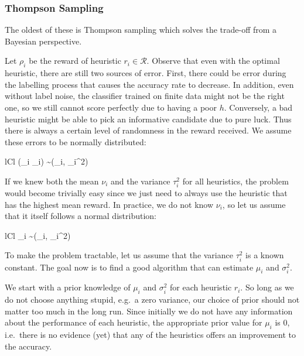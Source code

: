\documentclass[fleqn,10pt,lineno]{wlpeerj} %
\newcommand{\Normal}{\mathcal{N}}
\newcommand{\R}{\mathcal{R}}
\begin{document}
\subsubsection*{Thompson Sampling}

The oldest of these is Thompson sampling \citep{thompson33} which solves the
trade-off from a Bayesian perspective.

Let $\rho_i$ be the reward of heuristic $r_i \in \R$. Observe
that even with the optimal heuristic, there are still two sources of error.
First, there could be error during the labelling process that causes the
accuracy rate to decrease. In addition, even without label noise, the
classifier trained on finite data might not be the right one, so we still
cannot score perfectly due to having a poor $h$. Conversely, a bad heuristic
might be able to pick an informative candidate due to pure luck. Thus there is
always a certain level of randomness in the reward received. We assume these
errors to be normally distributed:
	\begin{IEEEeqnarray*}{lCl}
		(\rho_i \mid \nu_i) \sim \Normal(\nu_i, \tau_i^2)
	\end{IEEEeqnarray*}

If we knew both the mean $\nu_i$ and the variance $\tau_i^2$ for all
heuristics, the problem would become trivially easy since we just need to
always use the heuristic that has the highest mean reward. In practice, we do
not know $\nu_i$, so let us assume that it itself follows a normal
distribution:
	\begin{IEEEeqnarray*}{lCl}
        \nu_i \sim \Normal(\mu_i, \sigma_i^2)
    \end{IEEEeqnarray*}

To make the problem tractable, let us assume that the variance $\tau_i^2$ is a
known constant. The goal now is to find a good algorithm that can estimate
$\mu_i$ and $\sigma_i^2$.

We start with a prior knowledge of $\mu_i$ and $\sigma_i^2$ for each heuristic
$r_i$. So long as we do not choose anything stupid, e.g.\ a zero variance, our
choice of prior should not matter too much in the long run. Since initially we
do not have any information about the performance of each heuristic, the
appropriate prior value for $\mu_i$ is $0$, i.e.\ there is no evidence (yet)
that any of the heuristics offers an improvement to the accuracy.
\end{document}
